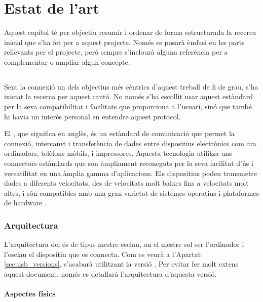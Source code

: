 \chapter{Estat de l'art}
\label{cap:estat-de-l-art}

Aquest capítol té per objectiu resumir i ordenar de forma estructurada la
recerca inicial que s'ha fet per a aquest projecte. Només es posarà èmfasi en
les parts rellevants per el projecte, però sempre s'inclourà alguna referència
per a complementar o ampliar algun concepte.

\section{}

Sent la connexió  un dels objectius més cèntrics d'aquest treball de
fi de grau, s'ha iniciat la recerca per aquest cantó. No només s'ha escollit
usar aquest estàndard per la seva compatibilitat
i facilitats que proporciona a l'usuari, sinó que també hi havia un interès
personal en entendre aquest protocol.

El , que significa  en anglès, és un
estàndard de comunicació que permet la connexió, intercanvi i transferència de
dades entre dispositius electrònics com ara ordinadors, telèfons mòbils, i
impressores. Aquesta tecnologia utilitza uns connectors estàndards que son
àmpliament reconeguts per la seva facilitat d'ús i versatilitat en una àmplia
gamma d'aplicacions. Els dispositius  poden transmetre dades a
diferents velocitats, des de velocitats molt baixes fins a velocitats molt
altes, i són compatibles amb una gran varietat de sistemes operatius i
plataformes de hardware \cite{Axelson2015USB}.

\subsection{Arquitectura}

L'arquitectura del  és de tipus mestre-esclau, on el mestre sol ser
l'ordinador i l'esclau el dispositiu que es connecta. Com es veurà a l'Apartat
\ref{sec:usb_versions}, s'acabarà utilitzant la versió . Per
evitar fer molt extens aquest document, només es detallarà l'arquitectura
d'aquesta versió.

\subsubsection*{Aspectes físics}

